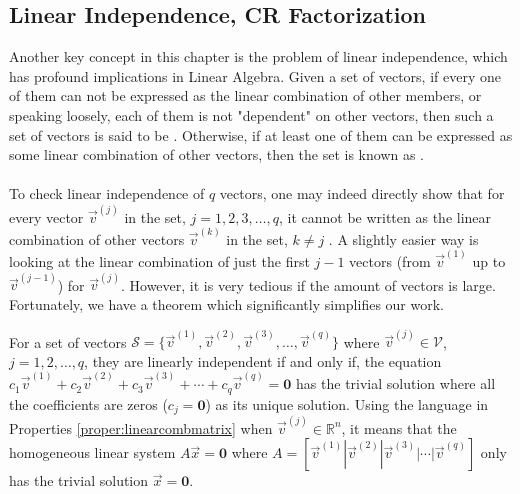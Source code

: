 \subsection{Linear Independence, CR Factorization}
\label{section:linearind}

Another key concept in this chapter is the problem of linear independence, which has profound implications in Linear Algebra. Given a set of vectors, if every one of them can not be expressed as the linear combination of other members, or speaking loosely, each of them is not "dependent" on other vectors, then such a set of vectors is said to be . Otherwise, if at least one of them can be expressed as some linear combination of other vectors, then the set is known as .\\
\\
To check linear independence of $q$ vectors, one may indeed directly show that for every vector $\vec{v}^{(j)}$ in the set, $j = 1,2,3,\ldots,q$, it cannot be written as the linear combination of other vectors $\vec{v}^{(k)}$ in the set, $k \neq j$ . A slightly easier way is looking at the linear combination of just the first $j-1$ vectors (from $\vec{v}^{(1)}$ up to $\vec{v}^{(j-1)}$) for $\vec{v}^{(j)}$. However, it is very tedious if the amount of vectors is large. Fortunately, we have a theorem which significantly simplifies our work.
\begin{thm}
\label{thm:linearindep}
For a set of vectors $\mathcal{S} = \{\vec{v}^{(1)}, \vec{v}^{(2)}, \vec{v}^{(3)}, \ldots, \vec{v}^{(q)}\}$ where $\vec{v}^{(j)} \in \mathcal{V}$, $j=1,2,\ldots,q$, they are linearly independent if and only if, the equation $c_1\vec{v}^{(1)} + c_2\vec{v}^{(2)} + c_3\vec{v}^{(3)} + \cdots + c_q\vec{v}^{(q)} = \textbf{0}$ has the trivial solution where all the coefficients are zeros ($c_j = \textbf{0}$) as its unique solution. Using the language in Properties \ref{proper:linearcombmatrix} when $\vec{v}^{(j)} \in \mathbb{R}^n$, it means that the homogeneous linear system $A\vec{x} = \textbf{0}$ where $A = [\vec{v}^{(1)}|\vec{v}^{(2)}|\vec{v}^{(3)}|\cdots|\vec{v}^{(q)}]$ only has the trivial solution $\vec{x} = \textbf{0}$.
\end{thm}
